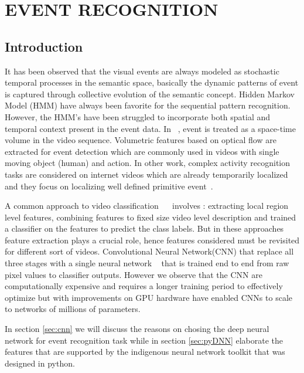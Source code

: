 \chapter{EVENT RECOGNITION}
 \label{chap:eventrec}
 \section{Introduction}
It has been observed that the visual events are always modeled as stochastic temporal processes in the semantic space, basically the dynamic patterns of event is captured through collective evolution of the semantic concept. Hidden Markov Model (HMM) have always been favorite for the sequential pattern recognition. However, the HMM's have been struggled to incorporate both spatial and temporal context present in the event data.  In ~\cite{YanKe05}, event is treated as a space-time volume in the video sequence. Volumetric features based on optical flow are extracted for event detection which are commonly used in videos with single moving object (human) and action. In other work, complex activity recognition tasks are considered on internet videos which are already temporarily localized and they focus on localizing well defined primitive event~\cite{YanKe07}.
\par A common approach to video classification ~\cite{Liu09}~\cite{Niebles10} involves : extracting local region level features, combining features to fixed size video level description and trained a classifier on the features to predict the class labels. But in these approaches feature extraction plays a crucial role, hence features considered must be revisited for different sort of videos. Convolutional Neural Network(CNN) that replace all three stages with a single neural network ~\cite{Ji13} that is trained end to end from raw pixel values to classifier outputs. However we observe that the CNN are computationally expensive and requires a longer training period to effectively optimize but with improvements on GPU hardware have enabled CNNs to scale to networks of millions of parameters.
\par In section \ref{sec:cnn}  we will discuss the reasons on chosing the deep neural network for event recognition task while in section \ref{sec:pyDNN} elaborate the features that are supported by the indigenous neural network toolkit that was designed in python.
